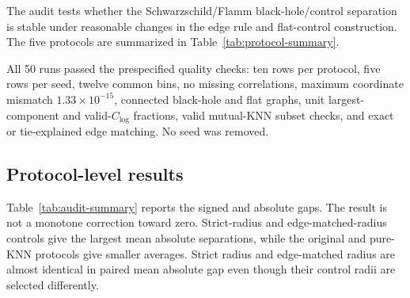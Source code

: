 \documentclass[11pt]{article}
\newcommand{\clog}{C_{\log}}
\begin{document}
The audit tests whether the Schwarzschild/Flamm black-hole/control separation is
stable under reasonable changes in the edge rule and flat-control construction.
The five protocols are summarized in Table~\ref{tab:protocol-summary}.

\begin{table}[H]
\centering
\caption{Graph-construction and matched-control protocols used in the paired
ten-seed audit.}
\label{tab:protocol-summary}
\small
\setlength{\tabcolsep}{4pt}
\end{table}

All 50 runs passed the prespecified quality checks: ten rows per protocol,
five rows per seed, twelve common bins, no missing correlations, maximum
coordinate mismatch $1.33\times10^{-15}$, connected black-hole and flat graphs,
unit largest-component and valid-$\clog$ fractions, valid mutual-KNN subset
checks, and exact or tie-explained edge matching. No seed was removed.

\subsection{Protocol-level results}

Table~\ref{tab:audit-summary} reports the signed and absolute gaps. The result
is not a monotone correction toward zero. Strict-radius and edge-matched-radius
controls give the largest mean absolute separations, while the original and
pure-KNN protocols give smaller averages. Strict radius and edge-matched radius
are almost identical in paired mean absolute gap even though their control
radii are selected differently.
\end{document}
